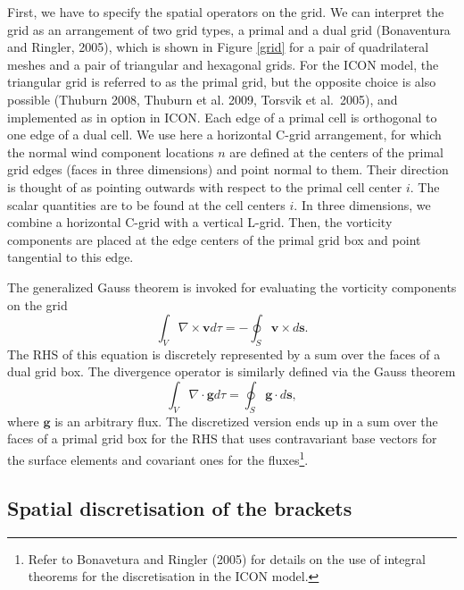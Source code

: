 First, we have to specify the spatial operators on the grid. We can interpret the grid as an arrangement of two grid types, a primal and a dual grid (Bonaventura and Ringler, 2005), which is shown in Figure \ref{grid} for a pair of
quadrilateral meshes and a pair of triangular and hexagonal grids. For the ICON model, the triangular grid is referred to as
the primal grid, but the opposite choice is also possible (Thuburn 2008, Thuburn et al. 2009, Torsvik et al.~2005), and implemented as in option in ICON.  
Each edge of
a primal cell is orthogonal to one edge of a dual cell. We use here a horizontal C-grid arrangement, for which the normal wind component locations $n$ are defined at the centers of the primal grid edges (faces in three dimensions) and point normal to them. Their direction is thought of as pointing outwards with respect to the primal cell center $i$. The scalar quantities
are to be found at the cell centers $i$.
In three dimensions, we combine a horizontal C-grid with a vertical L-grid. Then, the vorticity components are placed at the edge centers of the primal grid box and point tangential to this edge.

The generalized Gauss theorem is invoked for evaluating the vorticity components on the grid
\begin{equation}
 \int_V\nabla \times \mathbf{v} d\tau =-\oint_S \mathbf{v}\times d\mathbf{s}.
\end{equation}
The RHS of this equation is discretely represented by a sum over the faces of a dual grid box. The divergence operator is similarly defined via the Gauss theorem
\begin{equation}
 \int_V\nabla \cdot \mathbf{g} d\tau =\oint_S \mathbf{g} \cdot d\mathbf{s},
\end{equation}
where $\mathbf{g}$ is an arbitrary flux. The discretized version ends up in a sum over the faces of a primal grid box for the RHS that uses contravariant base vectors for the surface elements and covariant ones for the fluxes\footnote{Refer to
Bonavetura and Ringler (2005) for details on the use of integral theorems for the discretisation in the ICON model.}.

\subsection{Spatial discretisation of the brackets}

